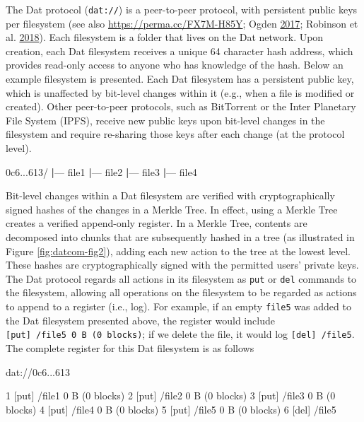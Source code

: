 \documentclass[a5paper]{book}
\newenvironment{Shaded}{\begin{snugshade}}{\end{snugshade}}
\newcommand{\KeywordTok}[1]{\textcolor[rgb]{0.13,0.29,0.53}{\textbf{#1}}}
\newcommand{\ExtensionTok}[1]{#1}
\newcommand{\NormalTok}[1]{#1}
\begin{document}
The Dat protocol (\texttt{dat://}) is a peer-to-peer protocol, with
persistent public keys per filesystem (see also
\url{https://perma.cc/FX7M-H85Y}; Ogden
\protect\hyperlink{ref-doi:10.31219ux2fosf.ioux2fnsv2c}{2017}; Robinson
et al. \protect\hyperlink{ref-doi:10.1038ux2fsdata.2018.221}{2018}).
Each filesystem is a folder that lives on the Dat network. Upon
creation, each Dat filesystem receives a unique 64 character hash
address, which provides read-only access to anyone who has knowledge of
the hash. Below an example filesystem is presented. Each Dat filesystem
has a persistent public key, which is unaffected by bit-level changes
within it (e.g., when a file is modified or created). Other peer-to-peer
protocols, such as BitTorrent or the Inter Planetary File System (IPFS),
receive new public keys upon bit-level changes in the filesystem and
require re-sharing those keys after each change (at the protocol level).

\begin{Shaded}
\begin{Highlighting}[]
\ExtensionTok{0c6...613/}
\KeywordTok{|}\ExtensionTok{---}\NormalTok{ file1}
\KeywordTok{|}\ExtensionTok{---}\NormalTok{ file2}
\KeywordTok{|}\ExtensionTok{---}\NormalTok{ file3}
\KeywordTok{|}\ExtensionTok{---}\NormalTok{ file4}
\end{Highlighting}
\end{Shaded}

Bit-level changes within a Dat filesystem are verified with
cryptographically signed hashes of the changes in a Merkle Tree. In
effect, using a Merkle Tree creates a verified append-only register. In
a Merkle Tree, contents are decomposed into chunks that are subsequently
hashed in a tree (as illustrated in Figure \ref{fig:datcom-fig2}),
adding each new action to the tree at the lowest level. These hashes are
cryptographically signed with the permitted users' private keys. The Dat
protocol regards all actions in its filesystem as \texttt{put} or
\texttt{del} commands to the filesystem, allowing all operations on the
filesystem to be regarded as actions to append to a register (i.e.,
log). For example, if an empty \texttt{file5} was added to the Dat
filesystem presented above, the register would include
\texttt{{[}put{]}~/file5~0~B~(0~blocks)}; if we delete the file, it
would log \texttt{{[}del{]}~/file5}. The complete register for this Dat
filesystem is as follows

\begin{Shaded}
\begin{Highlighting}[]
\ExtensionTok{dat}\NormalTok{://0c6...613}

\ExtensionTok{1}\NormalTok{ [put] /file1 0 B (0 blocks)}
\ExtensionTok{2}\NormalTok{ [put] /file2 0 B (0 blocks)}
\ExtensionTok{3}\NormalTok{ [put] /file3 0 B (0 blocks)}
\ExtensionTok{4}\NormalTok{ [put] /file4 0 B (0 blocks)}
\ExtensionTok{5}\NormalTok{ [put] /file5 0 B (0 blocks)}
\ExtensionTok{6}\NormalTok{ [del] /file5}
\end{Highlighting}
\end{Shaded}
\end{document}
